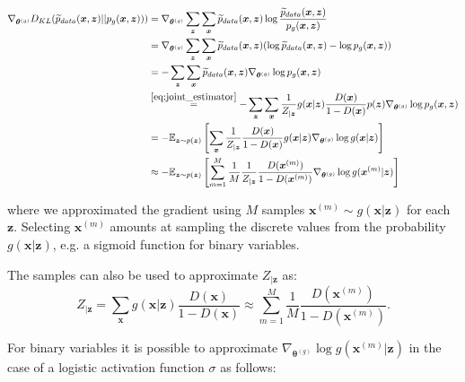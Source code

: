 \begin{align*}
\nabla_{\bm{\theta}^{(g)}} D_{KL}(\widetilde{p}_{data}(\bm{x},\bm{z}) || p_g(\bm{x},\bm{z}))) & = \nabla_{\bm{\theta}^{(g)}} \sum_{\bm{z}} \sum_{\bm{x}} \widetilde{p}_{data}(\bm{x},\bm{z}) \log{\frac{\widetilde{p}_{data}(\bm{x},\bm{z})}{p_g(\bm{x},\bm{z})}} \\
& = \nabla_{\bm{\theta}^{(g)}} \sum_{\bm{z}} \sum_{\bm{x}} \widetilde{p}_{data}(\bm{x},\bm{z}) (\log{\widetilde{p}_{data}(\bm{x},\bm{z}) - \log p_g(\bm{x},\bm{z})}) \\
& = - \sum_{\bm{z}} \sum_{\bm{x}} \widetilde{p}_{data}(\bm{x},\bm{z}) \nabla_{\bm{\theta}^{(g)}} \log p_g(\bm{x},\bm{z}) \\
& \stackrel{\eqref{eq:joint_estimator}}{=} - \sum_{\bm{z}} \sum_{\bm{x}} \frac{1}{Z_{|\bm{z}}}g(\bm{x}|\bm{z})\frac{D(\bm{x})}{1-D(\bm{x})}p(\bm{z}) \nabla_{\bm{\theta}^{(g)}} \log p_g(\bm{x},\bm{z}) \\
& = - \mathbb{E}_{\bm{z} \sim p(\bm{z})} \left[\sum_{\bm{x}} \frac{1}{Z_{|\bm{z}}}\frac{D(\bm{x})}{1-D(\bm{x})}g(\bm{x}|\bm{z}) \nabla_{\bm{\theta}^{(g)}}\log{g(\bm{x}|\bm{z})}\right]\\
& \approx - \mathbb{E}_{\bm{z} \sim p(\bm{z})} \left[\sum\limits_{m = 1}^{M} \frac{1}{M}\frac{1}{Z_{|\bm{z}}}\frac{D(\bm{x}^{(m)})}{1-D(\bm{x}^{(m)})}\nabla_{\bm{\theta}^{(g)}}\log{g(\bm{x}^{(m)}|\bm{z})}\right]
\end{align*}

where we approximated the gradient using $M$ samples
$\bm{x}^{(m)} \sim g(\bm{x}|\bm{z})$ for each $\bm{z}$. Selecting $\bm{x}^{(m)}$ amounts at sampling the discrete values from the probability $g(\bm{x}|\bm{z})$, e.g. a sigmoid function for binary variables.

The samples can also be used to approximate $Z_{|\bm{z}}$ as:
$$
Z_{|\bm{z}} = \sum_{\bm{x}} g(\bm{x}|\bm{z}) \frac{D(\bm{x})}{1-D(\bm{x})} \approx \sum\limits_{m = 1}^{M} \frac{1}{M}\frac{D(\bm{x}^{(m)})}{1-D(\bm{x}^{(m)})}.
$$

For binary variables it is possible to approximate $\nabla_{\bm{\theta}^{(g)}} \log{g(\bm{x}^{(m)}|\bm{z})}$ in the case of a logistic activation function $\sigma$ as follows:

